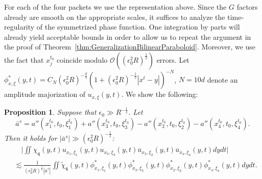 \documentclass{amsart}
\newtheorem{proposition}[theorem]{Proposition}
\theoremstyle{definition}
\begin{document}
For each of the four packets we use the representation above. Since the $G$ factors already are smooth on the appropriate scales, it suffices to analyze the time-regularity of the symmetrized phase function. One integration by parts will already yield acceptable bounds in order to allow us to repeat the argument in the proof of Theorem~\ref{thm:GeneralizationBilinearParaboloid}. Moreover, we use the fact that  $x_j^{t_0}$ coincide modulo $\mathcal{O}((\epsilon_0^2 R)^{\frac{1}{2}})$ errors. 
Let $\phi^*_{x,\xi}(y,t) = C_N (\epsilon_0^2 R)^{-\frac{d}{4}} (1+ (\epsilon_0^2 R)^{-\frac{1}{2}} |x^t - y|)^{-N}$, $N=10d$ denote an amplitude majorization of $u_{x,\xi}(y,t)$. We show the following: 
\begin{proposition}
\label{prop:TimeRegularityJoints}
Suppose that $\epsilon_0 \gg R^{-\frac{1}{2}}$. Let 
\begin{equation*}
\bar{a}^s = a''(x_1^{t_0},t_0,\xi_1^{t_0}) + a''(x_3^{t_0},t_0,\xi_3^{t_0}) - a''(x_2^{t_0},t_0,\xi_2^{t_0}) - a''(x_4^{t_0},t_0,\xi_4^{t_0}).
\end{equation*}
Then it holds for $|\bar{a}^s| \gg (\epsilon_0^2 R)^{-\frac{1}{2}}$:
\begin{equation*}
\begin{split}
&\quad \big| \iint \chi_{\mathfrak{q}}(y,t) u_{x_1,\xi_1}(y,t) u_{x_3,\xi_3}(y,t) \overline{u}_{x_2,\xi_2}(y,t) \overline{u}_{x_4,\xi_4}(y,t) dy dt \big| \\
 &\lesssim \frac{1}{(\epsilon_0^2 R)^{\frac{1}{2}} |\bar{a}^s|} \iint \tilde{\chi}_{\mathfrak{q}}(y,t) \phi^*_{x_1,\xi_1}(y,t) \phi^*_{x_3,\xi_3}(y,t) \phi^*_{x_2,\xi_2}(y,t) \phi^*_{x_4,\xi_4}(y,t) dy dt.
 \end{split}
\end{equation*}
\end{proposition}
\end{document}
